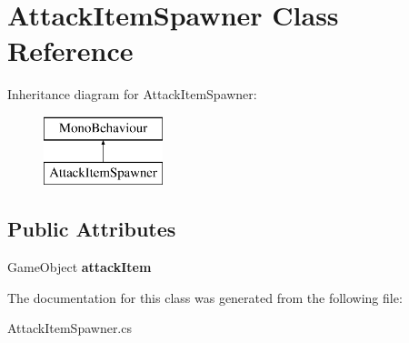 \hypertarget{class_attack_item_spawner}{}\section{Attack\+Item\+Spawner Class Reference}
\label{class_attack_item_spawner}
Inheritance diagram for Attack\+Item\+Spawner\+:\begin{figure}[H]
\begin{center}
\leavevmode
\includegraphics[height=2.000000cm]{class_attack_item_spawner}
\end{center}
\end{figure}
\subsection*{Public Attributes}
\begin{DoxyCompactItemize}
\item 
\mbox{\label{class_attack_item_spawner_a253acf52e39449ad655b3cfba7cc111d}} 
Game\+Object {\bfseries attack\+Item}
\end{DoxyCompactItemize}


The documentation for this class was generated from the following file\+:\begin{DoxyCompactItemize}
\item 
Attack\+Item\+Spawner.\+cs\end{DoxyCompactItemize}
